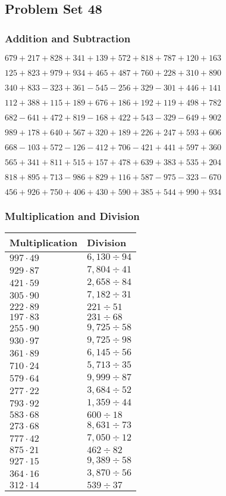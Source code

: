 \hypertarget{problem-set-48-1}{%
\subsection{Problem Set 48}\label{problem-set-48-1}}

\hypertarget{addition-and-subtraction-148}{%
\subsubsection{Addition and
Subtraction}\label{addition-and-subtraction-148}}

\(679 + 217 + 828 + 341 + 139 + 572 + 818 + 787 + 120 + 163\)

\(125 + 823 + 979 + 934 + 465 + 487 + 760 + 228 + 310 + 890\)

\(340 + 833 - 323 + 361 - 545 - 256 + 329 - 301 + 446 + 141\)

\(112 + 388 + 115 + 189 + 676 + 186 + 192 + 119 + 498 + 782\)

\(682 - 641 + 472 + 819 - 168 + 422 + 543 - 329 - 649 + 902\)

\(989 + 178 + 640 + 567 + 320 + 189 + 226 + 247 + 593 + 606\)

\(668 - 103 + 572 - 126 - 412 + 706 - 421 + 441 + 597 + 360\)

\(565 + 341 + 811 + 515 + 157 + 478 + 639 + 383 + 535 + 204\)

\(818 + 895 + 713 - 986 + 829 + 116 + 587 - 975 - 323 - 670\)

\(456 + 926 + 750 + 406 + 430 + 590 + 385 + 544 + 990 + 934\)

\hypertarget{multiplication-and-division-148}{%
\subsubsection{Multiplication and
Division}\label{multiplication-and-division-148}}

\begin{longtable}[]{@{}ll@{}}
\toprule
Multiplication & Division\tabularnewline
\midrule
\endhead
\(997 \cdot 49\) & \(6,130÷94\)\tabularnewline
\(929 \cdot 87\) & \(7,804÷41\)\tabularnewline
\(421 \cdot 59\) & \(2,658÷84\)\tabularnewline
\(305 \cdot 90\) & \(7,182÷31\)\tabularnewline
\(222 \cdot 89\) & \(221÷51\)\tabularnewline
\(197 \cdot 83\) & \(231÷68\)\tabularnewline
\(255 \cdot 90\) & \(9,725÷58\)\tabularnewline
\(930 \cdot 97\) & \(9,725÷98\)\tabularnewline
\(361 \cdot 89\) & \(6,145÷56\)\tabularnewline
\(710 \cdot 24\) & \(5,713÷35\)\tabularnewline
\(579 \cdot 64\) & \(9,999÷87\)\tabularnewline
\(277 \cdot 22\) & \(3,684÷52\)\tabularnewline
\(793 \cdot 92\) & \(1,359÷44\)\tabularnewline
\(583 \cdot 68\) & \(600÷18\)\tabularnewline
\(273 \cdot 68\) & \(8,631÷73\)\tabularnewline
\(777 \cdot 42\) & \(7,050÷12\)\tabularnewline
\(875 \cdot 21\) & \(462÷82\)\tabularnewline
\(927 \cdot 15\) & \(9,389÷58\)\tabularnewline
\(364 \cdot 16\) & \(3,870÷56\)\tabularnewline
\(312 \cdot 14\) & \(539÷37\)\tabularnewline
\bottomrule
\end{longtable}

